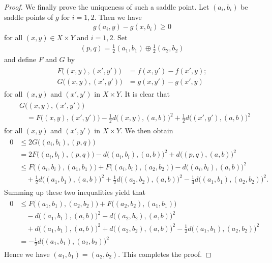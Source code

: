 \documentclass[draft]{amsart}
\numberwithin{equation}{section}
\theoremstyle{plain}
\theoremstyle{definition}
\theoremstyle{remark}
\begin{document}
\begin{proof}
 We finally prove the uniqueness of such a saddle point.  
 Let $(a_i,b_i)$ be saddle points of $g$ for $i=1,2$. 
 Then we have 
 \begin{align}
  g(a_i,y) - g(x,b_i) \geq 0 
 \end{align}
 for all $(x,y)\in X\times Y$ and $i=1,2$. 
 Set
 \begin{align}
  (p,q)=\frac{1}{2}(a_1,b_1)\oplus \frac{1}{2}(a_2,b_2)
 \end{align}
 and define $F$ and $G$ by 
 \begin{align}
 \begin{split}
  F\bigl((x,y),(x',y')\bigr) &= f(x,y')-f(x',y); \\
  G\bigl((x,y),(x',y')\bigr) &= g(x,y')-g(x',y)  
 \end{split}
 \end{align}
 for all $(x,y)$ and $(x',y')$ in $X\times Y$. 
 It is clear that 
 \begin{align}
 \begin{split}
  &G\bigl((x,y),(x',y')\bigr) \\
  &\quad = F\bigl((x,y),(x',y')\bigr) 
  -\frac{1}{2}d\bigl((x,y), (a,b)\bigr)^2 
  +\frac{1}{2}d\bigl((x',y'), (a,b)\bigr)^2  
 \end{split}
 \end{align}
for all $(x,y)$ and $(x',y')$ in $X\times Y$. 
 We then obtain 
 \begin{align}
 \begin{split}
  0 
  &\leq 2G\bigl((a_i,b_i),(p,q)\bigr) \\
  &= 2F\bigl((a_i,b_i),(p,q)\bigr)
 -d\bigl((a_i,b_i), (a,b)\bigr)^2 
  +d\bigl((p,q), (a,b)\bigr)^2 \\
  &\leq F\bigl((a_i,b_i),(a_1,b_1)\bigr) 
 + F\bigl((a_i,b_i),(a_2,b_2)\bigr)  -d\bigl((a_i,b_i), (a,b)\bigr)^2 \\
  &\quad +\frac{1}{2}d\bigl((a_1,b_1), (a,b)\bigr)^2 
+\frac{1}{2}d\bigl((a_2,b_2), (a,b)\bigr)^2 
 -\frac{1}{4}d\bigl((a_1,b_1), (a_2,b_2)\bigr)^2.   
 \end{split}
 \end{align}
 Summing up these two inequalities yield that 
 \begin{align}
 \begin{split}
  0&\leq 
 F\bigl((a_1,b_1),(a_2,b_2)\bigr) 
 + F\bigl((a_2,b_2),(a_1,b_1)\bigr) \\
 &\quad -d\bigl((a_1,b_1), (a,b)\bigr)^2 
-d\bigl((a_2,b_2), (a,b)\bigr)^2 \\
  &\quad +d\bigl((a_1,b_1), (a,b)\bigr)^2 
+d\bigl((a_2,b_2), (a,b)\bigr)^2 
 -\frac{1}{2}d\bigl((a_1,b_1), (a_2,b_2)\bigr)^2 \\
  &= -\frac{1}{2}d\bigl((a_1,b_1), (a_2,b_2)\bigr)^2  
 \end{split}
 \end{align}
Hence we have $(a_1,b_1)=(a_2,b_2)$. 
This completes the proof. 
\end{proof}
\end{document}
